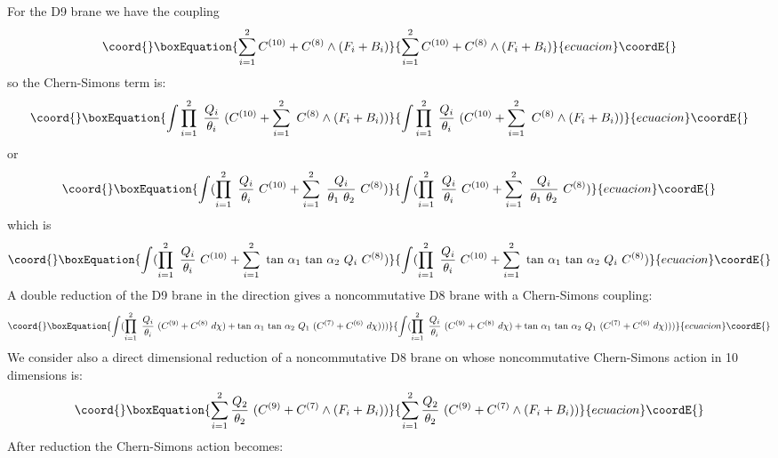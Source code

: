 \documentclass[a4paper,12pt]{article}
\begin{document}
For the D9 brane we have the coupling 
\begin{equation}\coord{}\boxEquation{
\sum_{i=1}^{2}  C^{(10)} + C^{(8)} \wedge (F_i + B_i)
}{
\sum_{i=1}^{2}  C^{(10)} + C^{(8)} \wedge (F_i + B_i)
}{ecuacion}\coordE{}\end{equation}  
so the Chern-Simons term is:
\begin{equation}\coord{}\boxEquation{
\int \prod_{i=1}^{2}~\frac{Q_i}{\theta_i}
~(C^{(10)} + \sum_{i=1}^{2}~C^{(8)} \wedge (F_i + B_i))
}{
\int \prod_{i=1}^{2}~\frac{Q_i}{\theta_i}
~(C^{(10)} + \sum_{i=1}^{2}~C^{(8)} \wedge (F_i + B_i))
}{ecuacion}\coordE{}\end{equation}
or
\begin{equation}\coord{}\boxEquation{ 
\int (\prod_{i=1}^{2}~\frac{Q_i}{\theta_i}~C^{(10)}
+ \sum_{i=1}^{2}~\frac{Q_i}{\theta_1~\theta_2}~C^{(8)}) 
}{ 
\int (\prod_{i=1}^{2}~\frac{Q_i}{\theta_i}~C^{(10)}
+ \sum_{i=1}^{2}~\frac{Q_i}{\theta_1~\theta_2}~C^{(8)}) 
}{ecuacion}\coordE{}\end{equation}
which is
\begin{equation}\coord{}\boxEquation{ 
\int (\prod_{i=1}^{2}~\frac{Q_i}{\theta_i}~C^{(10)}
+ \sum_{i=1}^{2}~\mbox{tan}~\alpha_1~\mbox{tan}~\alpha_2
~Q_i~C^{(8)})
}{ 
\int (\prod_{i=1}^{2}~\frac{Q_i}{\theta_i}~C^{(10)}
+ \sum_{i=1}^{2}~\mbox{tan}~\alpha_1~\mbox{tan}~\alpha_2
~Q_i~C^{(8)})
}{ecuacion}\coordE{}\end{equation}
A double reduction of the D9 brane in the \coordHE{} direction gives a 
noncommutative D8 brane with a Chern-Simons coupling:
\begin{equation}\coord{}\boxEquation{
\label{dr1}
\int (\prod_{i=1}^{2}~\frac{Q_i}{\theta_i}~(C^{(9)} +
C^{(8)}~d \chi)
+ \mbox{tan}~\alpha_1~\mbox{tan}~\alpha_2
~Q_1~(C^{(7)} + C^{(6)}~d \chi)))
}{
\int (\prod_{i=1}^{2}~\frac{Q_i}{\theta_i}~(C^{(9)} +
C^{(8)}~d \chi)
+ \mbox{tan}~\alpha_1~\mbox{tan}~\alpha_2
~Q_1~(C^{(7)} + C^{(6)}~d \chi)))
}{ecuacion}\coordE{}\end{equation}
We consider also a direct dimensional reduction of a noncommutative D8 
brane on \coordHE{} whose noncommutative 
Chern-Simons action in 10 dimensions is:
\begin{equation}\coord{}\boxEquation{
\sum_{i=1}^{2} \frac{Q_2}{\theta_2}~(C^{(9)} + C^{(7)} \wedge (F_i + B_i))
}{
\sum_{i=1}^{2} \frac{Q_2}{\theta_2}~(C^{(9)} + C^{(7)} \wedge (F_i + B_i))
}{ecuacion}\coordE{}\end{equation}  
After reduction the Chern-Simons action becomes:
\end{document}

